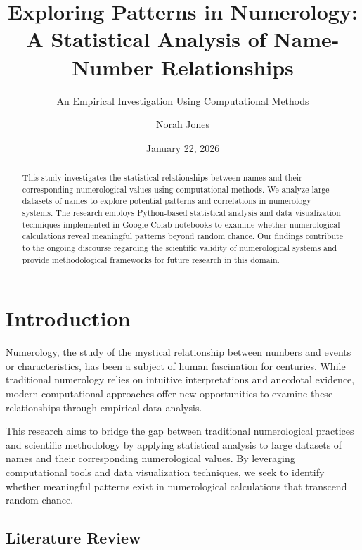 \documentclass[
  american,
  11pt,
  oneside]{article}
\title{Exploring Patterns in Numerology: A Statistical Analysis of
Name-Number Relationships}
\subtitle{An Empirical Investigation Using Computational Methods}
\author{Norah Jones}
\date{January 22, 2026}
\begin{document}
\maketitle
\begin{abstract}
This study investigates the statistical relationships between names and
their corresponding numerological values using computational methods. We
analyze large datasets of names to explore potential patterns and
correlations in numerology systems. The research employs Python-based
statistical analysis and data visualization techniques implemented in
Google Colab notebooks to examine whether numerological calculations
reveal meaningful patterns beyond random chance. Our findings contribute
to the ongoing discourse regarding the scientific validity of
numerological systems and provide methodological frameworks for future
research in this domain.
\end{abstract}




\section{Introduction}\label{introduction}

Numerology, the study of the mystical relationship between numbers and
events or characteristics, has been a subject of human fascination for
centuries. While traditional numerology relies on intuitive
interpretations and anecdotal evidence, modern computational approaches
offer new opportunities to examine these relationships through empirical
data analysis.

This research aims to bridge the gap between traditional numerological
practices and scientific methodology by applying statistical analysis to
large datasets of names and their corresponding numerological values. By
leveraging computational tools and data visualization techniques, we
seek to identify whether meaningful patterns exist in numerological
calculations that transcend random chance.

\subsection{Literature Review}\label{literature-review}
\end{document}
